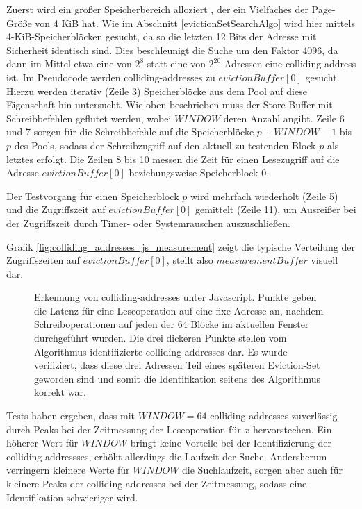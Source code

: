 Zuerst wird ein großer Speicherbereich alloziert %
, der ein Vielfaches der Page-Größe von 4 KiB hat.
Wie im Abschnitt \ref{evictionSetSearchAlgo} wird hier mittels 4-KiB-Speicherblöcken gesucht, da so die letzten 12 Bits der Adresse mit Sicherheit identisch sind.
Dies beschleunigt die Suche um den Faktor 4096, da dann im Mittel etwa eine von $2^8$ statt eine von $2^{20}$ Adressen eine colliding address ist.
Im Pseudocode werden colliding-addresses zu $evictionBuffer[0]$ gesucht.
Hierzu werden iterativ (Zeile 3) Speicherblöcke aus dem Pool auf diese Eigenschaft hin untersucht.
Wie oben beschrieben muss der Store-Buffer mit Schreibbefehlen geflutet werden, wobei $WINDOW$ deren Anzahl angibt.
Zeile 6 und 7 sorgen für die Schreibbefehle auf die Speicherblöcke $p + WINDOW - 1$ bis $p$ des Pools, sodass der Schreibzugriff auf den aktuell zu testenden Block $p$ als letztes erfolgt.
Die Zeilen 8 bis 10 messen die Zeit für einen Lesezugriff auf die Adresse $evictionBuffer[0]$ beziehungsweise Speicherblock 0.

Der Testvorgang für einen Speicherblock $p$ wird mehrfach wiederholt (Zeile 5) und die Zugriffszeit auf $evictionBuffer[0]$ gemittelt (Zeile 11), um Ausreißer bei der Zugriffszeit durch Timer- oder Systemrauschen auszuschließen. 

Grafik \ref{fig:colliding_addresses_js_measurement} zeigt die typische Verteilung der Zugriffszeiten auf $evictionBuffer[0]$, stellt also $measurementBuffer$ visuell dar.

\label{fig:colliding_addresses_js_measurement}
\begin{figure}[h]
\centering
\begin{scaletikzpicturetowidth}{\textwidth}

\end{scaletikzpicturetowidth}
\caption{Erkennung von colliding-addresses unter Javascript. Punkte geben die Latenz für eine Leseoperation auf eine fixe Adresse an, nachdem Schreiboperationen auf jeden der 64 Blöcke im aktuellen Fenster durchgeführt wurden. Die drei dickeren Punkte stellen vom Algorithmus identifizierte colliding-addresses dar. Es wurde verifiziert, dass diese drei Adressen Teil eines späteren Eviction-Set geworden sind und somit die Identifikation seitens des Algorithmus korrekt war.}
\end{figure}

Tests haben ergeben, dass mit $WINDOW=64$ colliding-addresses zuverlässig durch Peaks bei der Zeitmessung der Leseoperation für $x$ hervorstechen.
Ein höherer Wert für $WINDOW$ bringt keine Vorteile bei der Identifizierung der colliding addressses, erhöht allerdings die Laufzeit der Suche.
Andersherum verringern kleinere Werte für $WINDOW$ die Suchlaufzeit, sorgen aber auch für kleinere Peaks der colliding-addresses bei der Zeitmessung, sodass eine Identifikation schwieriger wird.

